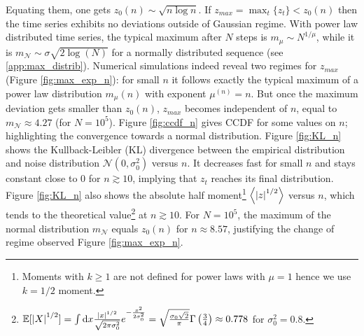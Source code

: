 \documentclass[FinalReport.tex]{subfiles}
\begin{document}
Equating them, one gets $z_0(n)\sim\sqrt{n\log{n}}$. If $z_{max}=\max_{t}\{z_t\}<z_0(n)$ then the time series exhibits no deviations outside of Gaussian regime. With power law distributed time series, the typical maximum after $N$ steps is $m_\mu\sim N^{1/\mu}$, while it is $m_\mathcal{N}\sim\sigma\sqrt{2\log(N)}$ for a normally distributed sequence (see  \autoref{app:max_distrib}). Numerical simulations indeed reveal two regimes for $z_{max}$ (Figure \ref{fig:max_exp_n}): for small $n$ it follows exactly the typical maximum of a power law distribution $m_\mu(n)$ with exponent $\mu^{(n)}=n$. But once the maximum deviation gets smaller than $z_0(n)$, $z_{max}$ becomes independent of $n$, equal to $m_\mathcal{N}\approx 4.27$ (for $N=10^5$). Figure \ref{fig:ccdf_n} gives CCDF for some values on $n$; highlighting the convergence towards a normal distribution.
Figure \ref{fig:KL_n} shows the Kullback-Leibler (KL) divergence between the empirical distribution and noise distribution $\mathcal{N}(0,\sigma_0^2)$ versus $n$. It decreases fast for small $n$ and stays constant close to $0$ for $n\gtrsim10$, implying that $z_t$ reaches its final distribution. 
Figure \ref{fig:KL_n} also shows the absolute half moment\footnote{Moments with $k\geq1$ are not defined for power laws with $\mu=1$ hence we use $k=1/2$ moment.} $\expval{\abs{z}^{1/2}}$ versus $n$, which tends to the theoretical value\footnote{$\mathbb{E}[\abs{X}^{1/2}]=\int \textrm{d} x \frac{\abs{x}^{1/2}}{\sqrt{2\pi\sigma_0^2}}e^{-\frac{x^2}{2\sigma_0^2}}=\sqrt{\frac{\sigma_0\sqrt{2}}{\pi}}\Gamma\left(\frac{3}{4}\right)\approx 0.778$ for $\sigma_0^2=0.8$.} at $n\gtrsim 10$. For $N=10^5$, the maximum of the normal distribution $m_\mathcal{N}$ equals $z_0(n)$ for $n\approx 8.57$, justifying the change of regime observed Figure \ref{fig:max_exp_n}.
\end{document}
